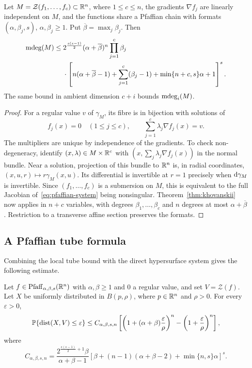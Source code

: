 \begin{proposition}\label{prop:pfaffian-degree-bound}
Let $M=\mathcal Z(f_1,\dots,f_c)\subset\mathbb{R}^n$, where $1\le c\le n$, the gradients $\nabla f_j$ are linearly independent on $M$, and the functions share a Pfaffian chain with formats $(\alpha,\beta_j,s)$, $\alpha,\beta_j\ge1$. Put $\overline\beta=\max_j\beta_j$. Then
\begin{align*}
\operatorname{\mathrm{mdeg}}(M)\le{}&
2^{\frac{s(s-1)}2}(\alpha+\overline\beta)^n\prod_{j=1}^c\beta_j\\
&{}\cdot\left[
n(\alpha+\overline\beta-1)+\sum_{j=1}^c(\beta_j-1)
+\min\{n+c,s\}\alpha+1
\right]^s.
\end{align*}
The same bound in ambient dimension $c+i$ bounds $\operatorname{\mathrm{mdeg}}_i(M)$.
\end{proposition}

\begin{proof}
For a regular value $v$ of $\gamma_M$, its fibre is in bijection with solutions of
\begin{equation}\label{eq:pfaffian-system}
f_j(x)=0\quad(1\le j\le c),\qquad
\sum_{j=1}^c\lambda_j\nabla f_j(x)=v.
\end{equation}
The multipliers are unique by independence of the gradients. To check non-degeneracy, identify $(x,\lambda)\in M\times\mathbb{R}^c$ with $(x,\sum_j\lambda_j\nabla f_j(x))$ in the normal bundle. Near a solution, projection of this bundle to $\mathbb{R}^n$ is, in radial coordinates, $(x,u,r)\mapsto r\gamma_M(x,u)$. Its differential is invertible at $r=1$ precisely when $\mathrm{d}{\gamma}_M$ is invertible. Since $(f_1,\dots,f_c)$ is a submersion on $M$, this is equivalent to the full Jacobian of~\eqref{eq:pfaffian-system} being nonsingular. Theorem~\ref{thm:khovanskii} now applies in $n+c$ variables, with degrees $\beta_1,\dots,\beta_c$ and $n$ degrees at most $\alpha+\overline\beta$. Restriction to a transverse affine section preserves the formats.
\end{proof}

\subsection{A Pfaffian tube formula}
Combining the local tube bound with the direct hypersurface system gives the following estimate.

\begin{theorem}\label{thm:prob_bound}
Let $f\in\mathrm{Pfaff}_{\alpha,\beta,s}(\mathbb{R}^n)$ with $\alpha,\beta\ge1$ and $0$ a regular value, and set $V=\mathcal Z(f)$. Let $X$ be uniformly distributed in $B(p,\rho)$, where $p\in\mathbb{R}^n$ and $\rho>0$. For every $\varepsilon>0$,
\[
\operatorname*{\mathbb{P}}\{\operatorname{dist}(X,V)\le\varepsilon\}\le
C_{\alpha,\beta,s,n}
\left[\left(1+(\alpha+\beta)\frac{\varepsilon}{\rho}\right)^n
-\left(1+\frac{\varepsilon}{\rho}\right)^n\right],
\]
where
\begin{equation}\label{eq:pfaffian-tube-constant}
C_{\alpha,\beta,s,n}
=\frac{2^{\frac{s(s-1)}2+1}\beta}{\alpha+\beta-1}
\left[\beta+(n-1)(\alpha+\beta-2)+\min\{n,s\}\alpha\right]^s.
\end{equation}
\end{theorem}

